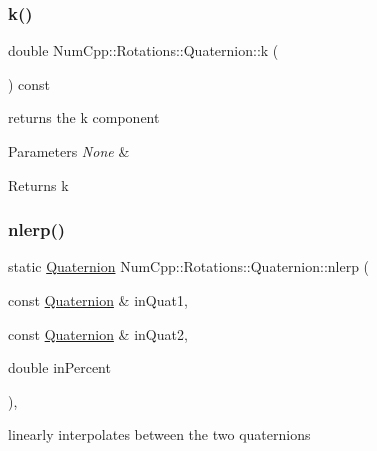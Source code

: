 \subsubsection{\texorpdfstring{k()}{k()}}
{\footnotesize\ttfamily double Num\+Cpp\+::\+Rotations\+::\+Quaternion\+::k (\begin{DoxyParamCaption}{ }\end{DoxyParamCaption}) const\hspace{0.3cm}{\ttfamily [inline]}}

returns the k component


\begin{DoxyParams}{Parameters}
{\em None} & \\
\hline
\end{DoxyParams}
\begin{DoxyReturn}{Returns}
k 
\end{DoxyReturn}
\mbox{\label{class_num_cpp_1_1_rotations_1_1_quaternion_ad3230f7957b05e62300b1da3a6bbb75f}} 
\subsubsection{\texorpdfstring{nlerp()}{nlerp()}\hspace{0.1cm}{\footnotesize\ttfamily [1/2]}}
{\footnotesize\ttfamily static \mbox{\hyperlink{class_num_cpp_1_1_rotations_1_1_quaternion}{Quaternion}} Num\+Cpp\+::\+Rotations\+::\+Quaternion\+::nlerp (\begin{DoxyParamCaption}\item[{const \mbox{\hyperlink{class_num_cpp_1_1_rotations_1_1_quaternion}{Quaternion}} \&}]{in\+Quat1,  }\item[{const \mbox{\hyperlink{class_num_cpp_1_1_rotations_1_1_quaternion}{Quaternion}} \&}]{in\+Quat2,  }\item[{double}]{in\+Percent }\end{DoxyParamCaption})\hspace{0.3cm}{\ttfamily [inline]}, {\ttfamily [static]}}

linearly interpolates between the two quaternions


